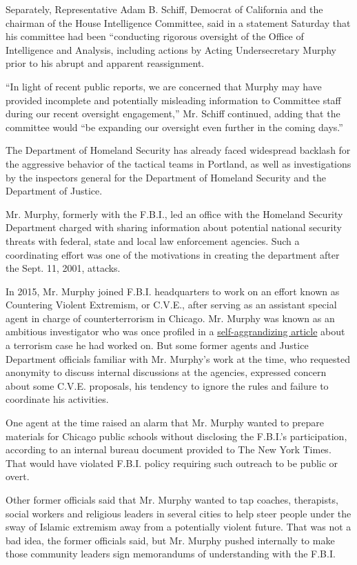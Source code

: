 Separately, Representative Adam B. Schiff, Democrat of California and
the chairman of the House Intelligence Committee, said in a statement
Saturday that his committee had been ``conducting rigorous oversight of
the Office of Intelligence and Analysis, including actions by Acting
Undersecretary Murphy prior to his abrupt and apparent reassignment.

``In light of recent public reports, we are concerned that Murphy may
have provided incomplete and potentially misleading information to
Committee staff during our recent oversight engagement,'' Mr. Schiff
continued, adding that the committee would ``be expanding our oversight
even further in the coming days.''

The Department of Homeland Security has already faced widespread
backlash for the aggressive behavior of the tactical teams in Portland,
as well as investigations by the inspectors general for the Department
of Homeland Security and the Department of Justice.

Mr. Murphy, formerly with the F.B.I., led an office with the Homeland
Security Department charged with sharing information about potential
national security threats with federal, state and local law enforcement
agencies. Such a coordinating effort was one of the motivations in
creating the department after the Sept. 11, 2001, attacks.

In 2015, Mr. Murphy joined F.B.I. headquarters to work on an effort
known as Countering Violent Extremism, or C.V.E., after serving as an
assistant special agent in charge of counterterrorism in Chicago. Mr.
Murphy was known as an ambitious investigator who was once profiled in a
\href{https://www.esquire.com/news-politics/a2184/esq0307murphy/}{self-aggrandizing
article} about a terrorism case he had worked on. But some former agents
and Justice Department officials familiar with Mr. Murphy's work at the
time, who requested anonymity to discuss internal discussions at the
agencies, expressed concern about some C.V.E. proposals, his tendency to
ignore the rules and failure to coordinate his activities.

One agent at the time raised an alarm that Mr. Murphy wanted to prepare
materials for Chicago public schools without disclosing the F.B.I.'s
participation, according to an internal bureau document provided to The
New York Times. That would have violated F.B.I. policy requiring such
outreach to be public or overt.

Other former officials said that Mr. Murphy wanted to tap coaches,
therapists, social workers and religious leaders in several cities to
help steer people under the sway of Islamic extremism away from a
potentially violent future. That was not a bad idea, the former
officials said, but Mr. Murphy pushed internally to make those community
leaders sign memorandums of understanding with the F.B.I.

